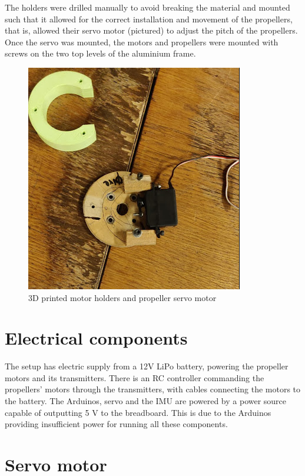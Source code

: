 The holders were drilled manually to avoid breaking the material and mounted such that it allowed for the correct installation and movement of the propellers, that is, allowed their servo motor (pictured) to adjust the pitch of the propellers. 
Once the servo was mounted, the motors and propellers were mounted with screws on the two top levels of the aluminium frame. 


\begin{figure}[h!]
    \centering
    \includegraphics[scale=0.8]{graphics/Drone/GreenHolders.png}
    \caption{3D printed motor holders and propeller servo motor}
     \label{fig:3D printed motor holders and propeller servo motor}
\end{figure} 

 
\section{Electrical components}

The setup has electric supply from a 12V LiPo battery, powering the propeller motors and its transmitters. There is an RC controller commanding the propellers’ motors through the transmitters, with cables connecting the motors to the battery. 
The Arduinos, servo and the IMU are powered by a power source capable of outputting 5 V to the breadboard. This is due to the Arduinos providing insufficient power for running all these components. 

\section{Servo motor}

